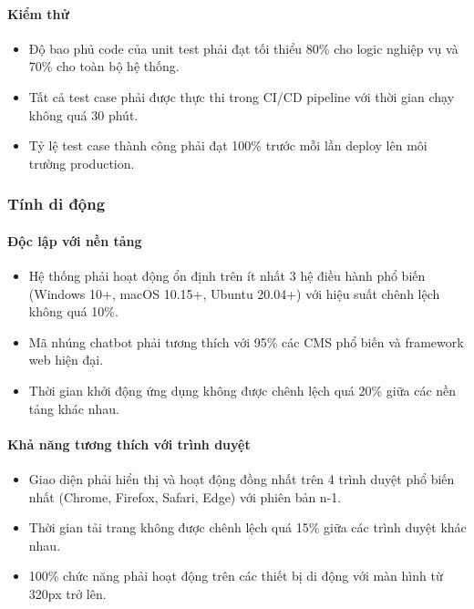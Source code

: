 \paragraph{Kiểm thử}
\begin{itemize}
    \item Độ bao phủ code của unit test phải đạt tối thiểu 80\% cho logic nghiệp vụ và 70\% cho toàn bộ hệ thống. 
    \item Tất cả test case phải được thực thi trong CI/CD pipeline với thời gian chạy không quá 30 phút. 
    \item Tỷ lệ test case thành công phải đạt 100\% trước mỗi lần deploy lên môi trường production. 
\end{itemize}

\subsubsection{Tính di động}

\paragraph{Độc lập với nền tảng}
\begin{itemize}
    \item Hệ thống phải hoạt động ổn định trên ít nhất 3 hệ điều hành phổ biến (Windows 10+, macOS 10.15+, Ubuntu 20.04+) với hiệu suất chênh lệch không quá 10\%. 
    \item Mã nhúng chatbot phải tương thích với 95\% các CMS phổ biến và framework web hiện đại. 
    \item Thời gian khởi động ứng dụng không được chênh lệch quá 20\% giữa các nền tảng khác nhau.
\end{itemize}

\paragraph{Khả năng tương thích với trình duyệt}
\begin{itemize}
    \item Giao diện phải hiển thị và hoạt động đồng nhất trên 4 trình duyệt phổ biến nhất (Chrome, Firefox, Safari, Edge) với phiên bản n-1. 
    \item Thời gian tải trang không được chênh lệch quá 15\% giữa các trình duyệt khác nhau. 
    \item 100\% chức năng phải hoạt động trên các thiết bị di động với màn hình từ 320px trở lên.
\end{itemize}

